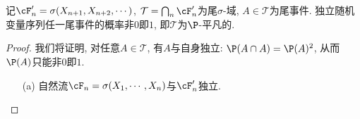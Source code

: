 \documentclass[a4paper, 10pt]{ctexart}
\begin{document}
\begin{theorem}[Kolmogorov 0-1 律]\label{thm:Kolmogorov0-1Law}
	记$\cF_n' = \sigma(X_{n+1}, X_{n+2}, \cdots)$, $\mathcal T = \bigcap_n \cF_n'$为尾$\sigma$-域, $A \in \mathcal T$为尾事件. 
	独立随机变量序列任一尾事件的概率非$0$即$1$, 即$\mathcal T$为$\P$-平凡的. 
\end{theorem}

\begin{proof}
	我们将证明, 对任意$A \in \mathcal T$, 有$A$与自身独立: $\P(A \cap A) = \P(A)^2$, 从而$\P(A)$只能非$0$即$1$. 
	\begin{enumerate}
		\item[(a)] 自然流$\cF_n = \sigma(X_1, \cdots, X_n)$与$\cF_n'$独立. 
	\end{enumerate}
\end{proof}




\nocite{klenke:2020a,durrett:2019a,williams:1991a}

{\small

}
\end{document}
